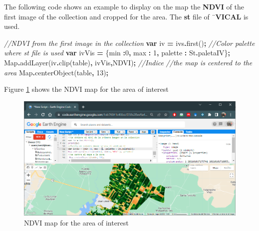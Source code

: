 \documentclass[
]{book}
\newenvironment{Shaded}{\begin{snugshade}}{\end{snugshade}}
\newcommand{\AttributeTok}[1]{\textcolor[rgb]{0.77,0.63,0.00}{#1}}
\newcommand{\BuiltInTok}[1]{#1}
\newcommand{\CommentTok}[1]{\textcolor[rgb]{0.56,0.35,0.01}{\textit{#1}}}
\newcommand{\DataTypeTok}[1]{\textcolor[rgb]{0.13,0.29,0.53}{#1}}
\newcommand{\DecValTok}[1]{\textcolor[rgb]{0.00,0.00,0.81}{#1}}
\newcommand{\FunctionTok}[1]{\textcolor[rgb]{0.00,0.00,0.00}{#1}}
\newcommand{\KeywordTok}[1]{\textcolor[rgb]{0.13,0.29,0.53}{\textbf{#1}}}
\newcommand{\NormalTok}[1]{#1}
\newcommand{\OperatorTok}[1]{\textcolor[rgb]{0.81,0.36,0.00}{\textbf{#1}}}
\newcommand{\StringTok}[1]{\textcolor[rgb]{0.31,0.60,0.02}{#1}}
\begin{document}
The following code shows an example to display on the map the \textbf{NDVI} of the first image of the collection and cropped for the area. The \textbf{st} file of ¨\textbf{VICAL} is used.

\begin{Shaded}
\begin{Highlighting}[]
\CommentTok{//NDVI from the first image in the collection}
\KeywordTok{var}\NormalTok{ iv }\OperatorTok{=}\NormalTok{ ivs}\OperatorTok{.}\FunctionTok{first}\NormalTok{()}\OperatorTok{;}
\CommentTok{//Color palette where \textquotesingle{}st\textquotesingle{} file is used}
\KeywordTok{var}\NormalTok{ ivVis }\OperatorTok{=}\NormalTok{ \{}\DataTypeTok{min} \OperatorTok{:}\DecValTok{0}\OperatorTok{,} \DataTypeTok{max} \OperatorTok{:} \DecValTok{1}\OperatorTok{,} \DataTypeTok{palette} \OperatorTok{:}\NormalTok{ St}\OperatorTok{.}\AttributeTok{paletaIV}\NormalTok{\}}\OperatorTok{;}
\BuiltInTok{Map}\OperatorTok{.}\FunctionTok{addLayer}\NormalTok{(iv}\OperatorTok{.}\FunctionTok{clip}\NormalTok{(table)}\OperatorTok{,}\NormalTok{ ivVis}\OperatorTok{,}\StringTok{\textquotesingle{}NDVI\textquotesingle{}}\NormalTok{)}\OperatorTok{;} \CommentTok{//Indice}
\CommentTok{//the map is centered to the area}
 \BuiltInTok{Map}\OperatorTok{.}\FunctionTok{centerObject}\NormalTok{(table}\OperatorTok{,} \DecValTok{13}\NormalTok{)}\OperatorTok{;}
\end{Highlighting}
\end{Shaded}

Figure \ref{fig:figV6} shows the NDVI map for the area of interest

\begin{figure}

{\centering \includegraphics[width=0.85\linewidth]{./images/Figure74} 

}

\caption{NDVI map for the area of interest}\label{fig:figV6}
\end{figure}
\end{document}
